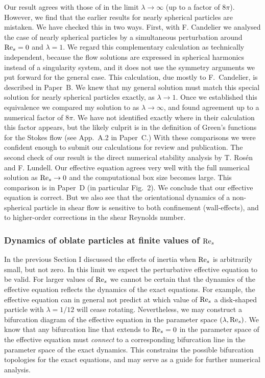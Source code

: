 \documentclass[thesis.tex]{subfiles}
\begin{document}
Our result  agrees with those of \citet{subramanian2005} in the limit $\lambda\to\infty$ (up to a factor of $8\pi$). However, we find that the earlier results for nearly spherical particles \cite{saffman1956,subramanian2006} are mistaken. We have checked this in two ways. First, with F. Candelier we analysed the case of nearly spherical particles by a simultaneous perturbation around $\textrm{Re}_s=0$ and $\lambda=1$. We regard this complementary calculation as technically independent, because the flow solutions are expressed in spherical harmonics instead of a singularity system, and it does not use the symmetry arguments we put forward for the general case. This calculation, due mostly to F.~Candelier, is described in Paper~B. We knew that my general solution must match this special solution for nearly spherical particles exactly, as $\lambda\to1$. Once we established this equivalence we compared my solution to \citet{subramanian2005} as $\lambda\to\infty$, and found agreement up to a numerical factor of $8\pi$. We have not identified exactly where in their calculation this factor appears, but the likely culprit is in the definition of Green's functions for the Stokes flow (see App.~A.2 in Paper~C.) With these comparisons we were confident enough to submit our calculations for review and publication. The second check of our result is the direct numerical stability analysis by T. Ros\'en and F. Lundell. Our effective equation  agrees very well with the full numerical solution as $\textrm{Re}_s\to0$ and the computational box size becomes large. This comparison is in Paper~D (in particular Fig.~2). We conclude that our effective equation is correct. But we also see that the orientational dynamics of a non-spherical particle in shear flow is sensitive to both confinement (wall-effects), and to higher-order corrections in the shear Reynolds number.

\subsubsection*{Dynamics of oblate particles at finite values of $\textrm{Re}_s$}
In the previous Section I discussed the effects of inertia when $\textrm{Re}_s$ is arbitrarily small, but not zero. In this limit we expect the perturbative effective equation  to be valid. For larger values of $\textrm{Re}_s$ we cannot be certain that the dynamics of the effective equation reflects the dynamics of the exact equations. For example, the effective equation can in general not predict at which value of $\textrm{Re}_s$ a disk-shaped particle with $\lambda=1/12$ will cease rotating. Nevertheless, we may construct a bifurcation diagram of the effective equation in the parameter space $(\lambda, \textrm{Re}_s)$. We know that any bifurcation line that extends to $\textrm{Re}_s=0$ in the parameter space of the effective equation must \emph{connect} to a corresponding bifurcation line in the parameter space of the exact dynamics. This constrains the possible bifurcation topologies for the exact equations, and may serve as a guide for further numerical analysis.
\end{document}
